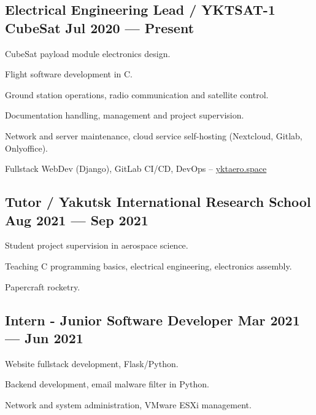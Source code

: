 \documentclass[letter,10pt]{article}
\begin{document}
\subsection{{Electrical Engineering Lead / YKTSAT-1 CubeSat \hfill Jul 2020 --- Present}}
\begin{zitemize}
\item CubeSat payload module electronics design.
\item Flight software development in C.
\item Ground station operations, radio communication and satellite control.
\item Documentation handling, management and project supervision.
\item Network and server maintenance, cloud service self-hosting (Nextcloud, Gitlab, Onlyoffice).
\item Fullstack WebDev (Django), GitLab CI/CD, DevOps -- \url{yktaero.space}
\end{zitemize}

\subsection{{Tutor / Yakutsk International Research School \hfill Aug 2021 --- Sep 2021}}
\begin{zitemize}
\item Student project supervision in aerospace science.
\item Teaching C programming basics, electrical engineering, electronics assembly.
\item Papercraft rocketry.
\end{zitemize}

\subsection{{Intern - Junior Software Developer \hfill Mar 2021 --- Jun 2021}}
\begin{zitemize}
\item Website fullstack development, Flask/Python.
\item Backend development, email malware filter in Python.
\item Network and system administration, VMware ESXi management.
\end{zitemize}
\end{document}
